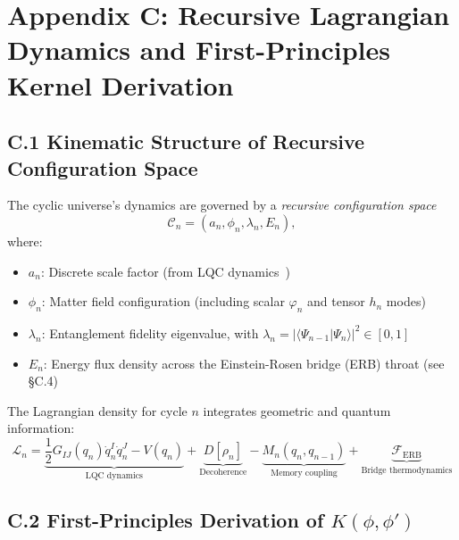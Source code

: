 \section*{Appendix C: Recursive Lagrangian Dynamics and First-Principles Kernel Derivation}

\subsection*{C.1 Kinematic Structure of Recursive Configuration Space}

The cyclic universe's dynamics are governed by a \textit{recursive configuration space}
\[
\mathcal{C}_n = (a_n, \phi_n, \lambda_n, E_n),
\]
where:
\begin{itemize}
  \item $a_n$: Discrete scale factor (from LQC dynamics~\cite{ashtekar2006quantum})
  \item $\phi_n$: Matter field configuration (including scalar $\varphi_n$ and tensor $h_n$ modes)
  \item $\lambda_n$: Entanglement fidelity eigenvalue, with $\lambda_n = |\langle \Psi_{n-1} | \Psi_n \rangle|^2 \in [0,1]$
  \item $E_n$: Energy flux density across the Einstein-Rosen bridge (ERB) throat (see \S C.4)
\end{itemize}

The Lagrangian density for cycle $n$ integrates geometric and quantum information:
\begin{equation}
\mathcal{L}_n = 
\underbrace{\frac{1}{2} G_{IJ}(q_n) \dot{q}_n^I \dot{q}_n^J - V(q_n)}_{\text{LQC dynamics}} 
+ \underbrace{D[\rho_n]}_{\text{Decoherence}} 
- \underbrace{M_n(q_n, q_{n-1})}_{\text{Memory coupling}} 
+ \underbrace{\mathcal{F}_{\text{ERB}}}_{\text{Bridge thermodynamics}}
\label{eq:full_lagrangian}
\end{equation}

\subsection*{C.2 First-Principles Derivation of $K(\phi,\phi')$}

